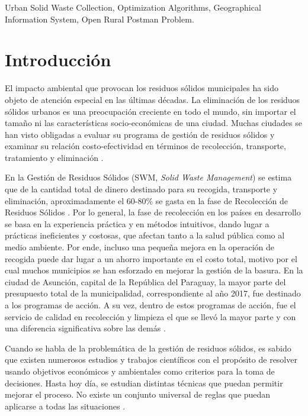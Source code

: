 \documentclass[spanish, conference]{IEEEtran}
\begin{document}
\begin{IEEEkeywords}
Urban Solid Waste Collection, Optimization Algorithms, Geographical Information System, Open Rural Postman Problem.
\end{IEEEkeywords}

\section{Introducción}
El impacto ambiental que provocan los residuos sólidos municipales ha sido objeto de atención especial en las últimas décadas. La eliminación de los residuos sólidos urbanos es una preocupación creciente en todo el mundo, sin importar el tamaño ni las características socio-económicas de una ciudad. Muchas ciudades se han visto obligadas a evaluar su programa de gestión de residuos sólidos y examinar su relación costo-efectividad en términos de recolección, transporte, tratamiento y eliminación \cite{Karadimas2007OptimalAlgorithm}.

En la Gestión de Residuos Sólidos (SWM, \textit{Solid Waste Management}) se estima que de la cantidad total de dinero destinado para su recogida, transporte y eliminación, aproximadamente el 60-80\% se gasta en la fase de Recolección de Residuos Sólidos \cite{Tavares2009OptimisationModelling} \cite{Dogan2003Report:Istanbul}. Por lo general, la fase de recolección en los países en desarrollo se basa en la experiencia práctica y en métodos intuitivos, dando lugar a prácticas ineficientes y costosas, que afectan tanto a la salud pública como al medio ambiente. Por ende, incluso una pequeña mejora en la operación de recogida puede dar lugar a un ahorro importante en el costo total, motivo por el cual muchos municipios se han esforzado en mejorar la gestión de la basura. En la ciudad de Asunción, capital de la República del Paraguay, la mayor parte del presupuesto total de la municipalidad, correspondiente al año 2017, fue destinado a los programas de acción. A su vez, dentro de estos programas de acción, fue el servicio de calidad en recolección y limpieza el que se llevó la mayor parte y con una diferencia significativa sobre las demás  \cite{MunicipalidaddeAsuncion2017Presupuesto2017}.

Cuando se habla de la problemática de la gestión de residuos sólidos, es sabido que existen numerosos estudios y trabajos científicos con el propósito de resolver usando objetivos económicos y ambientales como criterios para la toma de decisiones. Hasta hoy día, se estudian distintas técnicas que puedan permitir mejorar el proceso. No existe un conjunto universal de reglas que puedan aplicarse a todas las situaciones \cite{Tchobanoglous1993IntegratedIssues}.
\end{document}
